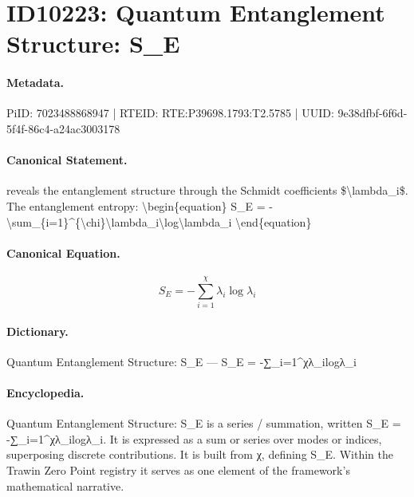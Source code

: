 \section*{ID10223: Quantum Entanglement Structure: S\_E}
\paragraph{Metadata.}
PiID: 7023488868947 | RTEID: RTE:P39698.1793:T2.5785 | UUID: 9e38dfbf-6f6d-5f4f-86c4-a24ac3003178

\paragraph{Canonical Statement.}
reveals the entanglement structure through the Schmidt coefficients \$\textbackslash{}lambda\_i\$. The entanglement entropy: \textbackslash{}begin\{equation\} S\_E = -\textbackslash{}sum\_\{i=1\}\textasciicircum{}\{\textbackslash{}chi\}\textbackslash{}lambda\_i\textbackslash{}log\textbackslash{}lambda\_i \textbackslash{}end\{equation\}

\paragraph{Canonical Equation.}
\[
S_E = -\sum_{i=1}^{\chi}\lambda_i\log\lambda_i
\]

\paragraph{Dictionary.}
Quantum Entanglement Structure: S\_E — S\_E = -∑\_i=1\textasciicircum{}χλ\_ilogλ\_i

\paragraph{Encyclopedia.}
Quantum Entanglement Structure: S\_E is a series / summation, written S\_E = -∑\_i=1\textasciicircum{}χλ\_ilogλ\_i. It is expressed as a sum or series over modes or indices, superposing discrete contributions. It is built from χ, defining S\_E. Within the Trawin Zero Point registry it serves as one element of the framework's mathematical narrative.

